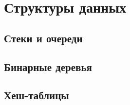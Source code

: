\chapter{Структуры данных}

\section{Стеки и очереди}

\section{Бинарные деревья}

\section{Хеш-таблицы}
